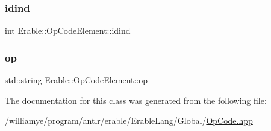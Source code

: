 \mbox{\label{class_erable_1_1_op_code_element_a7a7b309abb91e24736ecbf60f0cca4f0}} 
\subsubsection{\texorpdfstring{idind}{idind}}
{\footnotesize\ttfamily int Erable\+::\+Op\+Code\+Element\+::idind}

\mbox{\label{class_erable_1_1_op_code_element_aeabd3e06b3e767c681827b49e44f8df6}} 
\subsubsection{\texorpdfstring{op}{op}}
{\footnotesize\ttfamily std\+::string Erable\+::\+Op\+Code\+Element\+::op}



The documentation for this class was generated from the following file\+:\begin{DoxyCompactItemize}
\item 
/williamye/program/antlr/erable/\+Erable\+Lang/\+Global/\mbox{\hyperlink{_op_code_8hpp}{Op\+Code.\+hpp}}\end{DoxyCompactItemize}
